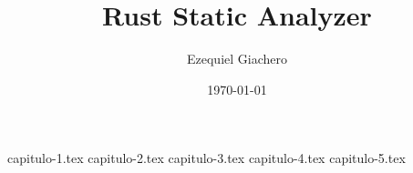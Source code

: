 \documentclass{report}
\title{Rust Static Analyzer}
\author{Ezequiel Giachero}
\date{\today}
\begin{document}
\maketitle
\tableofcontents

{capitulo-1.tex} %
{capitulo-2.tex} %
{capitulo-3.tex} %
{capitulo-4.tex} %
{capitulo-5.tex} %


\nocite{*}


\end{document}
